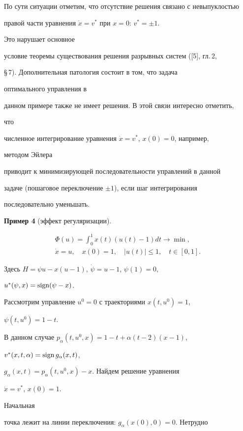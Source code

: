По сути ситуации отметим, что отсутствие решения связано с невыпуклостью 


правой части уравнения $\Dot x=v^*$ при $x=0$: $v^*=\pm 1$. 


Это нарушает основное 


условие теоремы существования решения разрывных систем ([5], гл.\,2, 


\S\,7). Дополнительная патология состоит в том, что задача 


оптимального управления в 


данном примере также не имеет решения. В этой связи интересно отметить, 


что 


численное интегрирование уравнения $\Dot x=v^*$, $x(0)=0$, например, 


методом Эйлера 


приводит к минимизирующей последовательности управлений в данной 


задаче (пошаговое переключение $\pm 1$), если шаг интегрирования 


последовательно уменьшать. 


 


{\bf Пример 4} (эффект регуляризации). 


\begin{gather*} 


\Phi(u)=\int^1_0x(t)(u(t)-1)dt\to\min,\\ 


\Dot x=u,\quad x(0)=1,\quad |u(t)|\le 1,\quad t\in[0,1]. 


\end{gather*} 


Здесь $H=\psi u-x(u-1)$, $\Dot\psi=u-1$, $\psi(1)=0$, 


$u^*(\psi,x)=\operatorname{sign}(\psi-x)$. 


Рассмотрим управление $u^0=0$ с траекториями $x(t,u^0)=1$, 


$\psi(t,u^0)=1-t$. 


В данном случае $p_\alpha(t,u^0,x)=1-t+\alpha(t-2)(x-1)$, 


$v^*(x,t,\alpha)=\operatorname{sign} g_\alpha(x,t)$, 


$g_\alpha(x,t)=p_\alpha(t,u^0,x)-x$. Найдем решение уравнения 


$\Dot x=v^*$, $x(0)=1$. 


Начальная 


точка лежит на линии переключения: $g_\alpha(x(0),0)=0$. Нетрудно 


